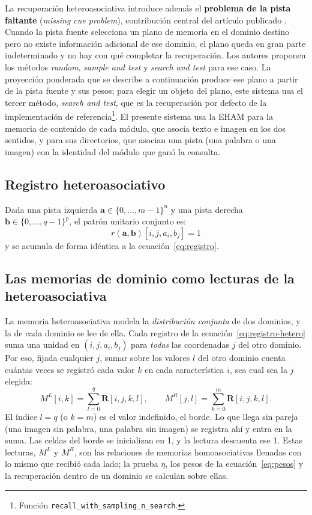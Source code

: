 La recuperación heteroasociativa introduce además el \textbf{problema de la pista faltante}
(\emph{missing cue problem}), contribución central del artículo publicado
\cite{morales2025missing}.
Cuando la pista fuente selecciona un plano de memoria en el dominio destino pero no
existe información adicional de ese dominio, el plano queda en gran parte indeterminado y no hay con qué completar la recuperación.
Los autores proponen los métodos \emph{random}, \emph{sample and test} y
\emph{search and test} para ese caso.
La proyección ponderada que se describe a continuación produce ese plano a partir de la
pista fuente y sus pesos; para elegir un objeto del plano, este sistema usa el tercer
método, \emph{search and test}, que es la recuperación por defecto de la implementación
de referencia\footnote{Función \texttt{recall\_with\_sampling\_n\_search}.}.
El presente sistema usa la EHAM para la memoria de contenido de cada módulo, que asocia
texto e imagen en los dos sentidos, y para sus directorios, que asocian una pista (una
palabra o una imagen) con la identidad del módulo que ganó la consulta.

\subsection*{Registro heteroasociativo}

Dada una pista izquierda $\mathbf{a} \in \{0,\ldots,m-1\}^n$ y una pista derecha
$\mathbf{b} \in \{0,\ldots,q-1\}^p$, el patrón unitario conjunto es:
\begin{equation}
    r(\mathbf{a}, \mathbf{b})[i, j, a_i, b_j] = 1
    \label{eq:registro-hetero}
\end{equation}
y se acumula de forma idéntica a la ecuación~\eqref{eq:registro}.

\subsection*{Las memorias de dominio como lecturas de la heteroasociativa}

La memoria heteroasociativa modela la \emph{distribución conjunta} de dos dominios, y
la de cada dominio se lee de ella.
Cada registro de la ecuación~\eqref{eq:registro-hetero} suma una unidad en
$(i, j, a_i, b_j)$ para \emph{todas} las coordenadas $j$ del otro dominio.
Por eso, fijada cualquier $j$, sumar sobre los valores $l$ del otro dominio cuenta
cuántas veces se registró cada valor $k$ en cada característica $i$, sea cual sea la $j$
elegida:
\begin{equation}
    M^{L}[i, k] = \sum_{l=0}^{q} \mathbf{R}[i, j, k, l],
    \qquad
    M^{R}[j, l] = \sum_{k=0}^{m} \mathbf{R}[i, j, k, l].
    \label{eq:marginal}
\end{equation}
El índice $l = q$ (o $k = m$) es el valor indefinido, el borde.
Lo que llega sin pareja (una imagen sin palabra, una palabra sin imagen) se registra ahí
y entra en la suma.
Las celdas del borde se inicializan en 1, y la lectura descuenta ese 1.
Estas lecturas, $M^{L}$ y $M^{R}$, son las relaciones de memorias homoasociativas
llenadas con lo mismo que recibió cada lado; la prueba $\eta$, los pesos de la
ecuación~\eqref{eq:pesos} y la recuperación dentro de un dominio se calculan sobre ellas.

